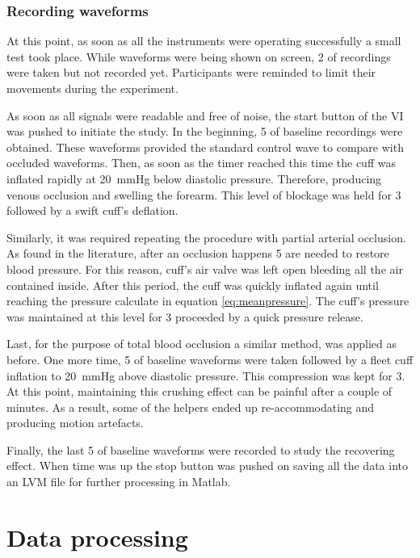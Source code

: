 \subsubsection{Recording waveforms}

At this point, as soon as all the instruments were operating successfully a small test took place. While waveforms were being shown on screen, \SI{2}{\min} of recordings were taken but not recorded yet. Participants were reminded to limit their movements during the experiment. 

As soon as all signals were readable and free of noise, the start button of the VI was pushed to initiate the study. In the beginning, \SI{5}{\min} of baseline recordings were obtained. These waveforms provided the standard control wave to compare with occluded waveforms. Then, as soon as the timer reached this time the cuff was inflated rapidly at \SI{20}{\mmHg} below diastolic pressure. Therefore, producing venous occlusion and swelling the forearm. This level of blockage was held for \SI{3}{\min} followed by a swift cuff's deflation. 

Similarly, it was required repeating the procedure with partial arterial occlusion. As found in the literature, after an occlusion happens \SI{5}{\min} are needed to restore blood pressure. For this reason, cuff's air valve was left open bleeding all the air contained inside. After this period, the cuff was quickly inflated again until reaching the pressure calculate in equation \ref{eq:meanpressure}. The cuff's pressure was maintained at this level for \SI{3}{\min} proceeded by a quick pressure release. 

Last, for the purpose of total blood occlusion a similar method, was applied as before. One more time, \SI{5}{\min} of baseline waveforms were taken followed by a fleet cuff inflation to \SI{20}{\mmHg} above diastolic pressure. This compression was kept for \SI{3}{\min}. At this point, maintaining this crushing effect can be painful after a couple of minutes. As a result, some of the helpers ended up re-accommodating and producing motion artefacts. 

Finally, the last \SI{5}{\min} of baseline waveforms were recorded to study the recovering effect. When time was up the stop button was pushed on saving all the data into an LVM file for further processing in Matlab. 

\section{Data processing}
\label{section4.2}


